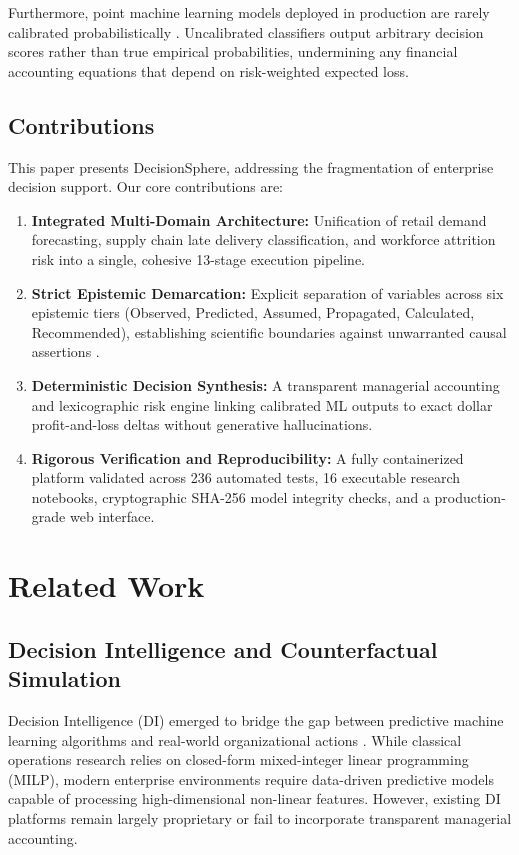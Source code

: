 \documentclass[10pt,conference]{IEEEtran}
\begin{document}
Furthermore, point machine learning models deployed in production are rarely calibrated probabilistically \cite{guo2017calibration}. Uncalibrated classifiers output arbitrary decision scores rather than true empirical probabilities, undermining any financial accounting equations that depend on risk-weighted expected loss.

\subsection{Contributions}
This paper presents DecisionSphere, addressing the fragmentation of enterprise decision support. Our core contributions are:
\begin{enumerate}
    \item \textbf{Integrated Multi-Domain Architecture:} Unification of retail demand forecasting, supply chain late delivery classification, and workforce attrition risk into a single, cohesive 13-stage execution pipeline.
    \item \textbf{Strict Epistemic Demarcation:} Explicit separation of variables across six epistemic tiers (Observed, Predicted, Assumed, Propagated, Calculated, Recommended), establishing scientific boundaries against unwarranted causal assertions \cite{shmueli2010explain}.
    \item \textbf{Deterministic Decision Synthesis:} A transparent managerial accounting and lexicographic risk engine linking calibrated ML outputs to exact dollar profit-and-loss deltas without generative hallucinations.
    \item \textbf{Rigorous Verification and Reproducibility:} A fully containerized platform validated across 236 automated tests, 16 executable research notebooks, cryptographic SHA-256 model integrity checks, and a production-grade web interface.
\end{enumerate}

\section{Related Work}

\subsection{Decision Intelligence and Counterfactual Simulation}
Decision Intelligence (DI) emerged to bridge the gap between predictive machine learning algorithms and real-world organizational actions \cite{pratt2019decision}. While classical operations research relies on closed-form mixed-integer linear programming (MILP), modern enterprise environments require data-driven predictive models capable of processing high-dimensional non-linear features. However, existing DI platforms remain largely proprietary or fail to incorporate transparent managerial accounting.
\end{document}
